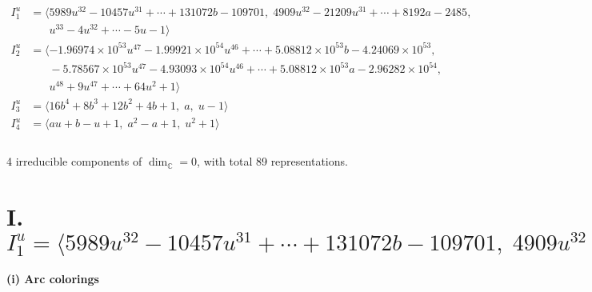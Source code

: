 \documentclass[1p]{elsarticle_modified}
\theoremstyle{definition}
\begin{document}
\begin{align*}
I^u_{1}&=\langle 
5989 u^{32}-10457 u^{31}+\cdots+131072 b-109701,\;4909 u^{32}-21209 u^{31}+\cdots+8192 a-2485,\\
\phantom{I^u_{1}}&\phantom{= \langle  }u^{33}-4 u^{32}+\cdots-5 u-1\rangle \\
I^u_{2}&=\langle 
-1.96974\times10^{53} u^{47}-1.99921\times10^{54} u^{46}+\cdots+5.08812\times10^{53} b-4.24069\times10^{53},\\
\phantom{I^u_{2}}&\phantom{= \langle  }-5.78567\times10^{53} u^{47}-4.93093\times10^{54} u^{46}+\cdots+5.08812\times10^{53} a-2.96282\times10^{54},\\
\phantom{I^u_{2}}&\phantom{= \langle  }u^{48}+9 u^{47}+\cdots+64 u^2+1\rangle \\
I^u_{3}&=\langle 
16 b^4+8 b^3+12 b^2+4 b+1,\;a,\;u-1\rangle \\
I^u_{4}&=\langle 
a u+b- u+1,\;a^2- a+1,\;u^2+1\rangle \\
\\
\end{align*}
\raggedright * 4 irreducible components of $\dim_{\mathbb{C}}=0$, with total 89 representations.\\
\newpage
\renewcommand{\arraystretch}{1}
\centering \section*{I. $I^u_{1}= \langle 5989 u^{32}-10457 u^{31}+\cdots+131072 b-109701,\;4909 u^{32}-21209 u^{31}+\cdots+8192 a-2485,\;u^{33}-4 u^{32}+\cdots-5 u-1 \rangle$}
\flushleft \textbf{(i) Arc colorings}\\
\end{document}
